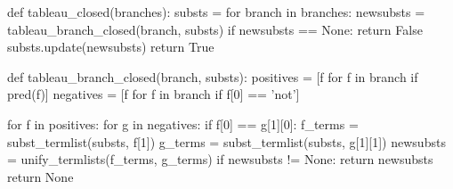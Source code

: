 \documentclass[a4paper,notitlepage]{scrartcl}
\begin{document}
\begin{code}
def tableau_closed(branches):
    substs = {}
    for branch in branches:
        newsubsts = tableau_branch_closed(branch, substs)
        if newsubsts == None:
            return False
        substs.update(newsubsts)
    return True

def tableau_branch_closed(branch, substs):
    positives = [f for f in branch if pred(f)]
    negatives = [f for f in branch if f[0] == 'not']

    for f in positives:
        for g in negatives:
            if f[0] == g[1][0]:
                f_terms = subst_termlist(substs, f[1])
                g_terms = subst_termlist(substs, g[1][1])
                newsubsts = unify_termlists(f_terms, g_terms)
                if newsubsts != None:
                    return newsubsts
    return None
\end{code}
\end{document}
